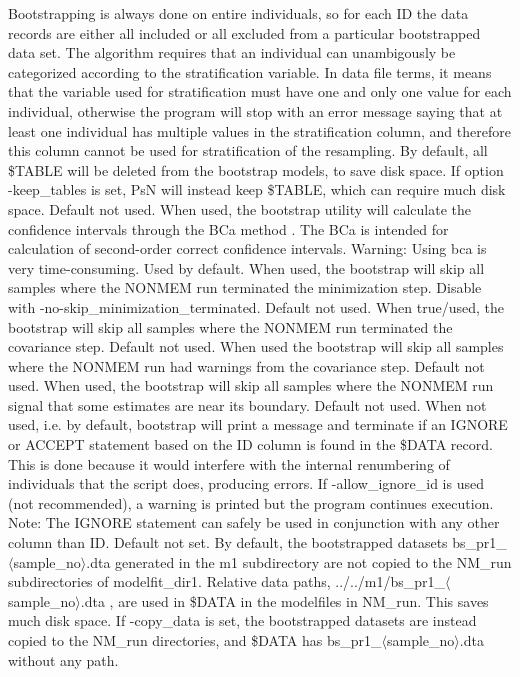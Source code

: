 \begin{optionlist}
Bootstrapping is always done on entire individuals, so for each ID the data records are either all included or all excluded from a particular bootstrapped data set.
The algorithm requires that an individual can unambigously be categorized according to the stratification variable. 
In data file terms, it means that the variable used for stratification must have one and only one value for each individual, otherwise the program will stop with an error message saying that at least one individual has multiple values
in the stratification column, and therefore this column cannot be used for stratification of the resampling.
\nextopt
{}
By default, all \$TABLE will be deleted from the bootstrap models, to save disk space. If option -keep\_tables is set, 
PsN will instead keep \$TABLE, which can require much disk space.
\nextopt
{}
Default not used. When used, the bootstrap utility will calculate the confidence intervals through the BCa method \cite{Efron}. The BCa is intended for calculation of second-order correct confidence intervals. Warning: Using bca is very time-consuming. 
\nextopt
{}
Used by default. When used, the bootstrap will skip all samples where the NONMEM run terminated the minimization step. Disable with -no-skip\_minimization\_terminated. 
\nextopt
{}
Default not used. When true/used, the bootstrap will skip all samples where the NONMEM run terminated the covariance step. 
\nextopt
{}
Default not used. When used the bootstrap will skip all samples where the NONMEM run had warnings from the covariance step. 
\nextopt
{}
Default not used. When used, the bootstrap will skip all samples where the NONMEM run signal that some estimates are near its boundary. 
\nextopt
{}
Default not used. When not used, i.e. by default, bootstrap will print a message and terminate if an IGNORE or ACCEPT statement based on the ID column is found in the \$DATA record. This is done because it would interfere with the internal renumbering of individuals that the script does, producing errors. If -allow\_ignore\_id is used (not recommended), a warning is printed but the program continues execution. Note: The IGNORE statement can safely be used in conjunction with any other column than ID. 
\nextopt
{}
Default not set. By default, the bootstrapped datasets bs\_pr1\_$\langle$sample\_no$\rangle$.dta generated in the m1 subdirectory are not copied to the NM\_run subdirectories of modelfit\_dir1. Relative data paths, ../../m1/bs\_pr1\_$\langle$sample\_no$\rangle$.dta , are used in \$DATA in the modelfiles in NM\_run. This saves much disk space. If -copy\_data is set, the bootstrapped datasets are instead copied to the NM\_run directories, and \$DATA has  bs\_pr1\_$\langle$sample\_no$\rangle$.dta without any path. 

\end{optionlist}
